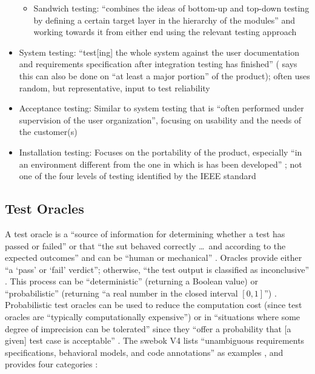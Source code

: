 \begin{itemize}
\begin{itemize}
              \item Sandwich testing: ``combines the ideas of bottom-up and
                    top-down testing by defining a certain target layer in
                    the hierarchy of the modules'' and working towards it
                    from either end using the relevant testing approach
                    \citep[p.~491]{PetersAndPedrycz2000}
          \end{itemize}
    \item System testing: ``test[ing] the whole system against the user
          documentation and requirements specification after integration
          testing has finished'' \citep[p.~439]{vanVliet2000}
          (\citep[p.~109]{Patton2006} says this can also be done on
          ``at least a major portion'' of the product); often uses random,
          but representative, input to test reliability
          \citep[p.~439]{vanVliet2000}
    \item Acceptance testing: Similar to system testing that is ``often
          performed under supervision of the user organization'',
          focusing on usability \citep[p.~439]{vanVliet2000} and
          the needs of the customer(s) \citep[p.~492]{PetersAndPedrycz2000}
    \item Installation testing: Focuses on the portability of the product,
          especially ``in an environment different from the one in which is
          has been developed'' \citep[p.~439]{vanVliet2000}; not
          one of the four levels of testing identified by the IEEE standard
          \citep[p.~445]{PetersAndPedrycz2000}
\end{itemize}

\subsection{Test Oracles}
A test oracle is a ``source of information for determining whether a test has
passed or failed'' \citep[p.~13]{IEEE2022} or that ``the \acs{sut} behaved
correctly \dots\ and according to the expected outcomes'' and can be ``human or
mechanical'' \citep[p.~5-5]{SWEBOK2024}. Oracles provide either ``a
`pass' or `fail' verdict''; otherwise, ``the test output is classified as
inconclusive'' \citep[p.~5-5]{SWEBOK2024}. This process can be ``deterministic''
(returning a Boolean value) or ``probabilistic'' (returning ``a real number in
the closed interval $[0, 1]$'') \citep[p.~509]{BarrEtAl2015}. Probabilistic
test oracles can be used to reduce the computation cost (since test oracles
are ``typically computationally expensive'') \citep[p.~509]{BarrEtAl2015}
or in ``situations where some degree of imprecision can be tolerated'' since
they ``offer a probability that [a given] test case is acceptable''
\citep[p.~510]{BarrEtAl2015}. The \acs{swebok} V4 lists ``unambiguous requirements
specifications, behavioral models, and code annotations'' as examples
\citep[p.~5-5]{SWEBOK2024}, and \citeauthor{BarrEtAl2015} provides four
categories \citeyearpar[p.~510]{BarrEtAl2015}:

